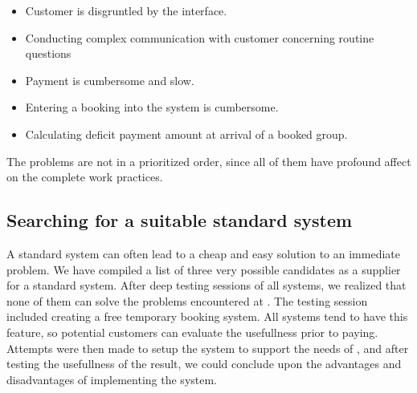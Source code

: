 \begin{itemize}
	\item Customer is disgruntled by the interface.
	\item Conducting complex communication with customer concerning routine questions
	\item Payment is cumbersome and slow.
	\item Entering a booking into the system is cumbersome.
	\item Calculating deficit payment amount at arrival of a booked group.
\end{itemize}

The problems are not in a prioritized order, since all of them have profound
affect on the complete work practices.


\subsection{Searching for a suitable standard system}
A standard system can often lead to a cheap and easy solution to an immediate problem.
We have compiled a list of three very possible
candidates as a supplier for a standard system. 
After deep testing sessions of all systems, we realized that none
of them can solve the problems encountered at \gomonkey{}. The testing
session included creating a free temporary booking system. All systems tend to 
have this feature, so potential customers can evaluate the usefullness prior to 
paying. Attempts were then made to setup the system to support the needs of
\gomonkey{}, and after testing the usefullness of the result, we could conclude
upon the advantages and disadvantages of implementing the system.


